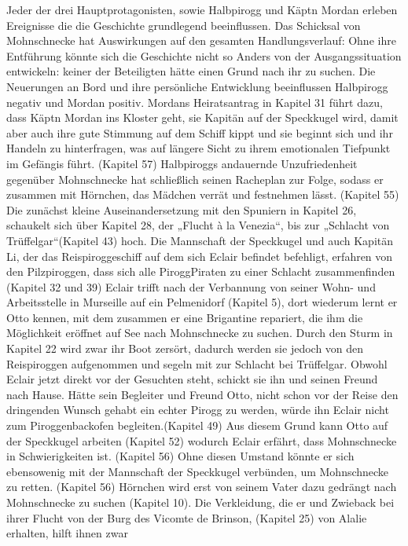 Jeder der drei Hauptprotagonisten, sowie Halbpirogg und Käptn Mordan erleben Ereignisse die die Geschichte 
grundlegend beeinflussen. Das Schicksal von Mohnschnecke hat Auswirkungen auf den gesamten Handlungsverlauf: 
Ohne ihre Entführung könnte sich die Geschichte nicht so Anders von der Ausgangssituation entwickeln: keiner 
der Beteiligten hätte einen Grund nach ihr zu suchen. Die Neuerungen an Bord und ihre persönliche Entwicklung 
beeinflussen Halbpirogg negativ und Mordan positiv. Mordans Heiratsantrag in Kapitel 31 führt dazu, dass Käptn 
Mordan ins Kloster geht, sie Kapitän auf der Speckkugel wird, damit aber auch ihre gute Stimmung auf dem Schiff 
kippt und sie beginnt sich und ihr Handeln zu hinterfragen, was auf längere Sicht zu ihrem emotionalen Tiefpunkt 
im Gefängis führt. (Kapitel 57) Halbpiroggs andauernde Unzufriedenheit gegenüber Mohnschnecke hat schließlich seinen Racheplan zur Folge, sodass er zusammen mit Hörnchen, das Mädchen verrät und festnehmen lässt. (Kapitel 55) 
Die zunächst kleine Auseinandersetzung mit den Spuniern in Kapitel 26, schaukelt sich über Kapitel 28, 
der „Flucht à la Venezia“, bis zur „Schlacht von Trüffelgar“(Kapitel 43) hoch. Die Mannschaft der Speckkugel 
und auch Kapitän Li, der das Reispiroggeschiff auf dem sich Eclair befindet befehligt, erfahren von den 
Pilzpiroggen, dass sich alle PiroggPiraten zu einer Schlacht zusammenfinden (Kapitel 32 und 39)
Eclair trifft nach der Verbannung von seiner Wohn- und Arbeitsstelle in Murseille auf ein Pelmenidorf (Kapitel 5), 
dort wiederum lernt er Otto kennen, mit dem zusammen er eine Brigantine repariert, die ihm die Möglichkeit eröffnet 
auf See nach Mohnschnecke zu suchen. Durch den Sturm in Kapitel 22 wird zwar ihr Boot zersört, dadurch werden sie 
jedoch von den Reispiroggen aufgenommen und segeln mit zur Schlacht bei Trüffelgar. Obwohl Eclair jetzt direkt vor 
der Gesuchten steht, schickt sie ihn und seinen Freund nach Hause. Hätte sein Begleiter und Freund Otto, 
nicht schon vor der Reise den dringenden Wunsch gehabt ein echter Pirogg zu werden, würde ihn Eclair nicht zum 
Piroggenbackofen begleiten.(Kapitel 49) Aus diesem Grund kann Otto auf der Speckkugel arbeiten (Kapitel 52) wodurch Eclair erfährt, dass Mohnschnecke in Schwierigkeiten ist. (Kapitel 56) Ohne diesen Umstand könnte 
er sich ebensowenig mit der Mannschaft der Speckkugel verbünden, um Mohnschnecke zu retten. (Kapitel 56) Hörnchen 
wird erst von seinem Vater dazu gedrängt nach Mohnschnecke zu suchen (Kapitel 10). Die Verkleidung, die er und 
Zwieback bei ihrer Flucht von der Burg des Vicomte de Brinson, (Kapitel 25) von Alalie erhalten, hilft ihnen zwar 
